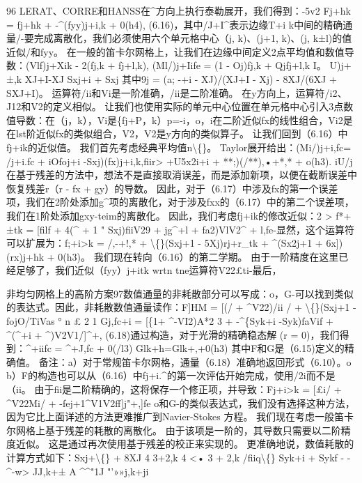 \documentclass[UTF8,11pt,a4paper,openany,fontset=fandol]{ctexbook}
\begin{document}
96 LERAT、CORRE和HANSS在\textasciicircum{}方向上执行泰勒展开，我们得到：-5v2 Fj+hk = fj+hk + -\textasciicircum{}(fyy)j+i,k + 0(h4), (6.16)，其中/J+I\textasciicircum{}表示边缘T+i k中间的精确通量/-要完成离散化，我们必须使用六个单元格中心（j, k)、(j+1, k)、(j, k±l)的值近似/和fyy。 在一般的笛卡尔网格上，让我们在边缘中间定义2点平均值和数值导数：(Vlf)j+Xik - 2(fj,k + fj+l,k), (Ml/)j+Iife = (1 - Oj)fj,k + Qjfj+l,k I。 U)j+±,k XJ+I-XJ Sxj+i + Sxj 其中9j = (a; -+i - XJ)/(XJ+I - Xj) - 8XJ/(6XJ + SXJ+I)。 运算符/ii和Vi是一阶准确，/ii是二阶准确。 在y方向上，运算符/i2、J12和V2的定义相似。 让我们也使用实际的单元中心位置在单元格中心引入3点数值导数：在（j，k），Vi是\{fj+P，k）p=-i，o，i在二阶近似fx的线性组合，Vi2是在lst阶近似fx的类似组合，V2，V2是y方向的类似算子。 让我们回到（6.16）中fj+ik的近似值。 我们首先考虑经典平均值n\textbackslash\{\}。 Taylor展开给出：(Mi/)j+i,fc= /j+i.fc + iOfoj+i -Sxj)(fx)j+i,k,fiir> +U5x2i+i + **;)(/**),•+*,* + o(h3). iU/j 在基于残差的方法中，想法不是直接取消误差，而是添加新项，以便在截断误差中恢复残差r（r - fx + gy）的导数。 因此，对于（6.17）中涉及fx的第一个误差项，我们在2阶处添加g\textasciicircum{}项的离散化，对于涉及fxx的（6.17）中的第二个误差项，我们在1阶处添加gxy-teim的离散化。 因此，我们考虑fj+ik的修改近似：2 > f*+±tk = [filf + 4(\textasciicircum{} + 1 " Sxj)fiiV29 + jg\textasciicircum{}+l + fa2)VlV2\textasciicircum{} + l,fe-显然，这个运算符可以扩展为：f;+i>k = /,-+!,* + \textbackslash\{\}(Sxj+1 - 5Xj)rj+r\_tk + \textasciicircum{}(Sx2j+1 + 6x])(rx)j+hk + 0(h3)。 我们现在转向（6.16）的第二学期。 由于一阶精度在这里已经足够了，我们近似（fyy）j+itk wrtn tne运算符V22£ti-最后，

非均匀网格上的高阶方案97数值通量的非耗散部分可以写成：o，G-可以找到类似的表达式。因此，非耗散数值通量读作：F]HM = [(/ + \textasciicircum{}V22)/ii / + \textbackslash\{\}(Sxj+1 - fojO/TiVas ° n £ 2 1 Gj,fc+i = [\{1+ \textasciicircum{}-VI2)A*2 3 + -\textasciicircum{}\{Syk+i -Syk)faVif + \textasciicircum{}(\textasciicircum{}+i + \textasciicircum{})V2V1/]\textasciicircum{}+, (6.18)通过构造，对于光滑的精确稳态解 (r = 0)，我们得到：\textasciicircum{}+iifc = \textasciicircum{}+J,fc + 0(/l3) Glk+h=Glk+,+0(h3) 其中F和G是（6.15)定义的精确值。 备注：a）对于常规笛卡尔网格，通量（6.18）准确地返回形式（6.10）。o b）F的构造也可以从（6.16）中fj+i.\textasciicircum{}的第一次评估开始完成，使用/2i而不是（ii。 由于fii是二阶精确的，这将保存一个修正项，并导致：Fj+i>k = [£i/ + \textasciicircum{}V22Mi/ + -fej+1\textasciicircum{}V1V2ff]j"+,]fe o和G-的类似表达式，我们没有选择这种方法，因为它比上面详述的方法更难推广到Navier-Stokes 方程。 我们现在考虑一般笛卡尔网格上基于残差的耗散的离散化。 由于该项是一阶的，其导数只需要以二阶精度近似。 这是通过再次使用基于残差的校正来实现的。 更准确地说，数值耗散的计算方式如下：Sxj+\textbackslash\{\} + 8XJ 4 3+2,k 4 <• 3 + 2,k /fiiq\textbackslash\{\} Syk+i + Sykf - - \textasciicircum{}-w> JJ,k+± A \textasciicircum{}\textasciicircum{}"1J "'»»j,k+ji
\end{document}
